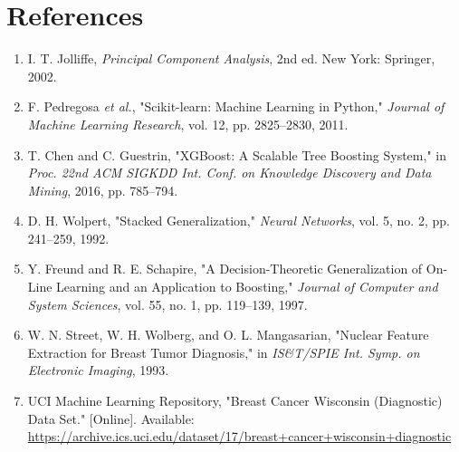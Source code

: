 \documentclass[12pt,a4paper]{article}
\begin{document}
\section{References}
\begin{enumerate}[leftmargin=*]
\item I. T. Jolliffe, \textit{Principal Component Analysis}, 2nd ed. New York: Springer, 2002.
\item F. Pedregosa \textit{et al.}, "Scikit-learn: Machine Learning in Python," \textit{Journal of Machine Learning Research}, vol. 12, pp. 2825--2830, 2011.
\item T. Chen and C. Guestrin, "XGBoost: A Scalable Tree Boosting System," in \textit{Proc. 22nd ACM SIGKDD Int. Conf. on Knowledge Discovery and Data Mining}, 2016, pp. 785--794.
\item D. H. Wolpert, "Stacked Generalization," \textit{Neural Networks}, vol. 5, no. 2, pp. 241--259, 1992.
\item Y. Freund and R. E. Schapire, "A Decision-Theoretic Generalization of On-Line Learning and an Application to Boosting," \textit{Journal of Computer and System Sciences}, vol. 55, no. 1, pp. 119--139, 1997.
\item W. N. Street, W. H. Wolberg, and O. L. Mangasarian, "Nuclear Feature Extraction for Breast Tumor Diagnosis," in \textit{IS\&T/SPIE Int. Symp. on Electronic Imaging}, 1993.
\item UCI Machine Learning Repository, "Breast Cancer Wisconsin (Diagnostic) Data Set." [Online]. Available: \url{https://archive.ics.uci.edu/dataset/17/breast+cancer+wisconsin+diagnostic}
\end{enumerate}
\end{document}
